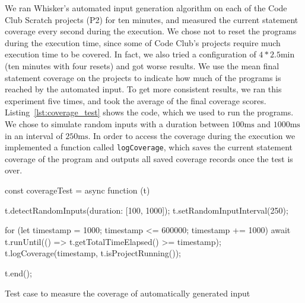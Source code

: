 We ran Whisker's automated input generation algorithm on each of the Code Club Scratch projects (P2) for ten minutes,
and measured the current statement coverage every second during the execution.
We chose not to reset the programs during the execution time,
since some of Code Club's projects require much execution time to be covered.
In fact, we also tried a configuration of $4 * 2.5\text{min}$ (ten minutes with four resets)
and got worse results.
We use the mean final statement coverage on the projects to indicate how much of the programs is reached by the automated input.
To get more consistent results, we ran this experiment five times, and took the average of the final coverage scores.
Listing~\ref{lst:coverage_test} shows the code, which we used to run the programs.
We chose to simulate random inputs with a duration between $100\text{ms}$ and $1000\text{ms}$ in an interval of $250\text{ms}$.
In order to access the coverage during the execution we implemented a function called \texttt{logCoverage},
which saves the current statement coverage of the program and outputs all saved coverage records once the test is over.
\parspace


\begin{listing}[ht]
    \centering

    \begin{minipage}{.9\textwidth}
        \begin{javascriptcode}
            const coverageTest = async function (t) {
                t.detectRandomInputs({duration: [100, 1000]});
                t.setRandomInputInterval(250);

                for (let timestamp = 1000; timestamp <= 600000; timestamp += 1000) {
                    await t.runUntil(() => t.getTotalTimeElapsed() >= timestamp);
                    t.logCoverage(timestamp, t.isProjectRunning());
                }

                t.end();
            }
        \end{javascriptcode}
    \end{minipage}

    \caption{Test case to measure the coverage of automatically generated input}
    \label{lst:coverage_test}
\end{listing}

